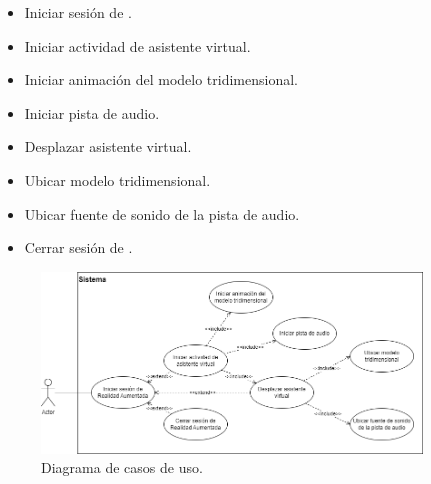 \documentclass{subfiles}
\begin{document}
        \begin{itemize}
            \item Iniciar sesión de \ra.
            \item Iniciar actividad de asistente virtual.
            \item Iniciar animación del modelo tridimensional.
            \item Iniciar pista de audio.
            \item Desplazar asistente virtual.
            \item Ubicar modelo tridimensional.
            \item Ubicar fuente de sonido de la pista de audio.
            \item Cerrar sesión de \ra.
        \end{itemize}

\begin{figure}[ht]
\centering
\includegraphics[width=0.9\textwidth]{img/analisis_casos_de_uso.png}
\caption{Diagrama de casos de uso.}
\label{fig:analisis_casos_de_uso}
\end{figure}

\end{document}

